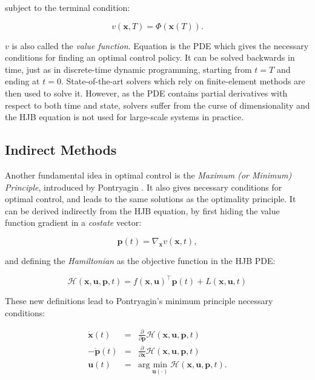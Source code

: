 \noindent subject to the terminal condition:

\begin{equation}
\label{eq:chap3-hjb-cond}
v(\mathbf{x},T)=\Phi(\mathbf{x}(T)).
\end{equation}

\noindent $v$ is also called the \emph{value function}. Equation
 is the PDE which gives the necessary conditions
for finding an optimal control policy. It can be solved backwards in
time, just as in discrete-time dynamic programming, starting from
$t=T$ and ending at $ t=0$. State-of-the-art solvers which rely on
finite-element methods are then used to solve it. However, as the PDE
contains partial derivatives with respect to both time and state,
solvers suffer from the curse of dimensionality and the HJB equation
is not used for large-scale systems in practice.

\subsection{Indirect Methods}

Another fundamental idea in optimal control is the \emph{Maximum (or
  Minimum) Principle}, introduced by Pontryagin
\cite{boltyanskii1960theory}. It also gives necessary conditions for
optimal control, and leads to the same solutions as the optimality
principle. It can be derived indirectly from the HJB equation, by
first hiding the value function gradient in a \emph{costate} vector:

\begin{equation}
  \mathbf{p}(t) = \nabla_{\mathbf{x}} v(\mathbf{x},t),
\end{equation} 

\noindent and defining the \emph{Hamiltonian} as the objective function in the
HJB PDE:

\begin{equation}
  \mathcal{H}(\mathbf{x},\mathbf{u},\mathbf{p},t) = f(\mathbf{x},
  \mathbf{u})^{\top}\mathbf{p}(t) + L (\mathbf{x}, \mathbf{u},t)
\end{equation}

\noindent These new definitions lead to Pontryagin's minimum principle
necessary conditions:

\begin{equation}
\begin{array}{rcl}
\dot{\mathbf{x}}(t) &=&
\frac{\partial}{\partial\mathbf{p}}\mathcal{H}(\mathbf{x},\mathbf{u},\mathbf{p},t)
\\ -\dot{\mathbf{p}}(t) &=&
\frac{\partial}{\partial\mathbf{x}}\mathcal{H}(\mathbf{x},\mathbf{u},\mathbf{p},t)
\\ \mathbf{u}(t) &=&
\text{arg}\min_{\mathbf{u}(\cdot)}\mathcal{H}(\mathbf{x},\mathbf{u},\mathbf{p},t).
\end{array}
\end{equation}


